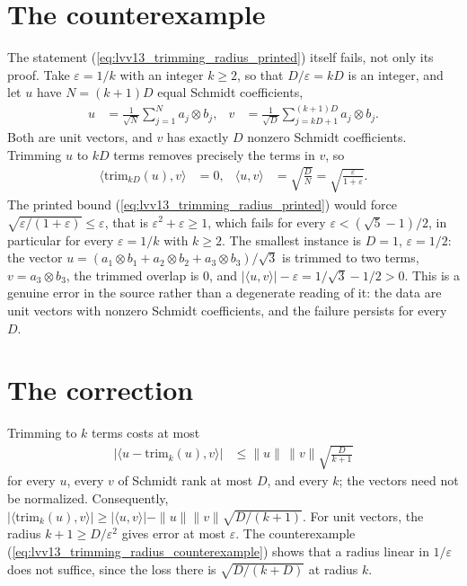 \documentclass{article}
\begin{document}
\section{The counterexample}

The statement (\ref{eq:lvv13_trimming_radius_printed}) itself fails, not
only its proof. Take $\varepsilon=1/k$ with an integer $k\ge2$, so that
$D/\varepsilon=kD$ is an integer, and let $u$ have $N=(k+1)D$ equal Schmidt
coefficients,
\begin{align}
    u & =\frac{1}{\sqrt N}\sum_{j=1}^{N}a_j\otimes b_j,
      & v & =\frac{1}{\sqrt D}\sum_{j=kD+1}^{(k+1)D}a_j\otimes b_j.
    \label{eq:lvv13_trimming_radius_counterexample}
\end{align}
Both are unit vectors, and $v$ has exactly $D$ nonzero Schmidt coefficients.
Trimming $u$ to $kD$ terms removes precisely the terms in $v$, so
\begin{align}
    \langle\mathrm{trim}_{kD}(u),v\rangle & =0,
                                           &
    \langle u,v\rangle                     & =\sqrt{\frac DN}
    =\sqrt{\frac{\varepsilon}{1+\varepsilon}}.
    \label{eq:lvv13_trimming_radius_overlaps}
\end{align}
The printed bound (\ref{eq:lvv13_trimming_radius_printed}) would force
$\sqrt{\varepsilon/(1+\varepsilon)}\le\varepsilon$, that is
$\varepsilon^2+\varepsilon\ge1$, which fails for every
$\varepsilon<(\sqrt5-1)/2$, in particular for every $\varepsilon=1/k$ with
$k\ge2$. The smallest instance is $D=1$, $\varepsilon=1/2$: the vector
$u=(a_1\otimes b_1+a_2\otimes b_2+a_3\otimes b_3)/\sqrt3$ is trimmed to two
terms, $v=a_3\otimes b_3$, the trimmed overlap is $0$, and
$|\langle u,v\rangle|-\varepsilon=1/\sqrt3-1/2>0$.
This is a genuine error in the source rather than a degenerate reading of
it: the data are unit vectors with nonzero Schmidt coefficients, and the
failure persists for every $D$.

\section{The correction}

Trimming to $k$ terms costs at most
\begin{align}
    \bigl|\langle u-\mathrm{trim}_k(u),v\rangle\bigr|
     & \le\|u\|\,\|v\|\sqrt{\frac{D}{k+1}}
    \label{eq:lvv13_trimming_radius_corrected}
\end{align}
for every $u$, every $v$ of Schmidt rank at most $D$, and every $k$; the
vectors need not be normalized. Consequently,
$|\langle\mathrm{trim}_k(u),v\rangle|\ge|\langle u,v\rangle|-
\|u\|\|v\|\sqrt{D/(k+1)}$. For unit vectors, the radius
$k+1\ge D/\varepsilon^2$ gives error at most $\varepsilon$. The
counterexample (\ref{eq:lvv13_trimming_radius_counterexample}) shows that a
radius linear in $1/\varepsilon$ does not suffice, since the loss there is
$\sqrt{D/(k+D)}$ at radius $k$.
\end{document}
